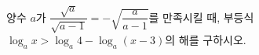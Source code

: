 양수 $a$가 $\dfrac{\sqrt{a}}{\sqrt{a-1}}=-\sqrt{\dfrac{a}{a-1}}$를 만족시킬 때, 부등식 $\log_a x>\log_a 4-\log_a (x-3)$의 해를 구하시오.
